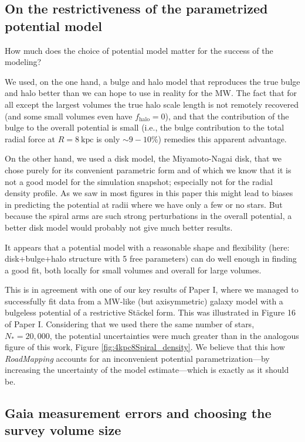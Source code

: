 \documentclass[iop,revtex4,numberedappendix,appendixfloats]{emulateapj}
\newcommand{\RM}{{\sl RoadMapping}}
\begin{document}
\subsection{On the restrictiveness of the parametrized potential model}

How much does the choice of potential model matter for the success of the modeling?

We used, on the one hand, a bulge and halo model that reproduces the true bulge and halo better than we can hope to use in reality for the MW. The fact that for all except the largest volumes the true halo scale length is not remotely recovered (and some small volumes even have $f_\text{halo}=0$), and that the contribution of the bulge to the overall potential is small (i.e., the bulge contribution to the total radial force at $R=8~\text{kpc}$ is only $\sim 9-10\%$) remedies this apparent advantage. 

On the other hand, we used a disk model, the Miyamoto-Nagai disk, that we chose purely for its convenient parametric form and of which we know that it is not a good model for the simulation snapshot; especially not for the radial density profile. As we saw in most figures in this paper this might lead to biases in predicting the potential at radii where we have only a few or no stars. But because the spiral arms are such strong perturbations in the overall potential, a better disk model would probably not give much better results.

It appears that a potential model with a reasonable shape and flexibility (here: disk+bulge+halo structure with 5 free parameters) can do well enough in finding a good fit, both locally for small volumes and overall for large volumes.

This is in agreement with one of our key results of Paper I, where we managed to successfully fit data from a MW-like (but axisymmetric) galaxy model with a bulgeless potential of a restrictive St\"ackel form. This was illustrated in Figure 16 of Paper I. Considering that we used there the same number of stars, $N_*=20,000$, the potential uncertainties were much greater than in the analogous figure of this work, Figure \ref{fig:4kpc8Spiral_density}. We believe that this how \RM{} accounts for an inconvenient potential parametrization---by increasing the uncertainty of the model estimate---which is exactly as it should be.

\subsection{Gaia measurement errors and choosing the survey volume size} \label{sec:discussion_choosing_SV}
\end{document}
